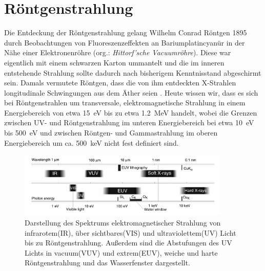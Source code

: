 \section{Röntgenstrahlung}
Die Entdeckung der Röntgenstrahlung gelang Wilhelm Conrad Röntgen 1895 durch Beobachtungen von Fluoreszenzeffekten an Bariumplatincyanür in der Nähe einer Elektronenröhre (org.: \textit{Hittorf'sche Vacuumröhre}). Diese war eigentlich mit einem schwarzen Karton ummantelt und die im inneren entstehende Strahlung sollte dadurch nach bisherigem Kenntnisstand abgeschirmt sein. Damals vermutete Röntgen, dass die von ihm entdeckten X-Strahlen longitudinale Schwingungen aus dem Äther seien \cite[Absätze~1,2,17]{wcrpaper}. Heute wissen wir, dass es sich bei Röntgenstrahlen um transversale, elektromagnetische Strahlung in einem Energiebereich von etwa \SI{15}{\electronvolt} bis zu etwa \SI{1.2}{\mega\electronvolt} handelt, wobei die Grenzen zwischen UV- und Röntgenstrahlung im unteren Energiebereich bei etwa \SI{10}{\electronvolt} bis \SI{500}{\electronvolt}  und zwischen Röntgen- und Gammastrahlung im oberen Energiebereich um ca. \SI{500}{\kilo\electronvolt} nicht fest definiert sind.\newline

\begin{figure}[H] %
  \centering
     \includegraphics[width=0.9\textwidth]{illustrations/spectrumEMradiation.png}
  \caption[Spektrum EM-Strahlung]{Darstellung des Spektrums elektromagnetischer Strahlung von infrarotem(IR), über sichtbares(VIS) und ultraviolettem(UV) Licht bis zu Röntgenstrahlung. Außerdem sind die Abstufungen des UV Lichts in vacuum(VUV) und extrem(EUV), weiche und harte Röntgenstrahlung und das Wasserfenster dargestellt. \cite[S.~34]{bbbook}}
  \label{fig:spectrumEMradiation}
\end{figure}

